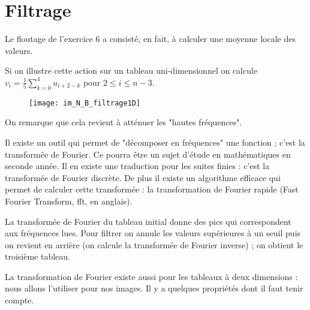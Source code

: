 \section{Filtrage}
Le floutage de l'exercice 6 a consisté, en fait, à calculer une moyenne locale des valeurs.

Si on illustre cette action sur un tableau uni-dimensionnel on calcule $\displaystyle v_i = \frac 15 \sum_{k=0}^4 u_{i+2-k}$ pour $2 \le i \le n-3$.

\begin{figure}[!h]
\centering
\texttt{[image: im\_N\_B\_filtrage1D]}
\end{figure}
On remarque que cela revient à atténuer les "hautes fréquences".

Il existe un outil qui permet de "décomposer en fréquences" une fonction ; c'est la transformée de Fourier. Ce pourra être un sujet d'étude en mathématiques en seconde année. Il en existe une traduction pour les suites finies : c'est la transformée de Fourier discrète. De plus il existe un algorithme efficace qui permet de calculer cette transformée : la transformation de Fourier rapide (Fast Fourier Transform, {\sc fft}, en anglais).

La transformée de Fourier du tableau initial donne des pics qui correspondent aux fréquences lues. Pour filtrer on annule les valeurs supérieures à un seuil puis on revient en arrière (on calcule la transformée de Fourier inverse) ; on obtient le troisième tableau.

\medskip

La transformation de Fourier existe aussi pour les tableaux à deux dimensions : nous allons l'utiliser pour nos images. Il y a quelques propriétés dont il faut tenir compte.

